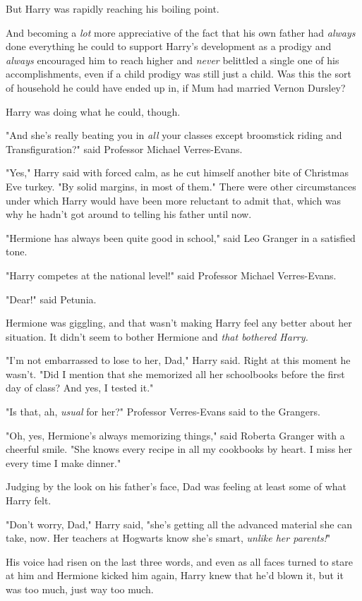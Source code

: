 But Harry was rapidly reaching his boiling point.

And becoming a \emph{lot} more appreciative of the fact that his own father had
\emph{always} done everything he could to support Harry's development as a
prodigy and \emph{always} encouraged him to reach higher and \emph{never}
belittled a single one of his accomplishments, even if a child prodigy was
still just a child. Was this the sort of household he could have ended up in,
if Mum had married Vernon Dursley?

Harry was doing what he could, though.

"And she's really beating you in \emph{all} your classes except broomstick
riding and Transfiguration?" said Professor Michael Verres-Evans.

"Yes," Harry said with forced calm, as he cut himself another bite of Christmas
Eve turkey. "By solid margins, in most of them." There were other circumstances
under which Harry would have been more reluctant to admit that, which was why
he hadn't got around to telling his father until now.

"Hermione has always been quite good in school," said Leo Granger in a
satisfied tone.

"Harry competes at the national level!" said Professor Michael Verres-Evans.

"Dear!" said Petunia.

Hermione was giggling, and that wasn't making Harry feel any better about her
situation. It didn't seem to bother Hermione and \emph{that bothered Harry.}

"I'm not embarrassed to lose to her, Dad," Harry said. Right at this moment he
wasn't. "Did I mention that she memorized all her schoolbooks before the first
day of class? And yes, I tested it."

"Is that, ah, \emph{usual} for her?" Professor Verres-Evans said to the
Grangers.

"Oh, yes, Hermione's always memorizing things," said Roberta Granger with a
cheerful smile. "She knows every recipe in all my cookbooks by heart. I miss
her every time I make dinner."

Judging by the look on his father's face, Dad was feeling at least some of what
Harry felt.

"Don't worry, Dad," Harry said, "she's getting all the advanced material she
can take, now. Her teachers at Hogwarts know she's smart, \emph{unlike her
parents!}"

His voice had risen on the last three words, and even as all faces turned to
stare at him and Hermione kicked him again, Harry knew that he'd blown it, but
it was too much, just way too much.

